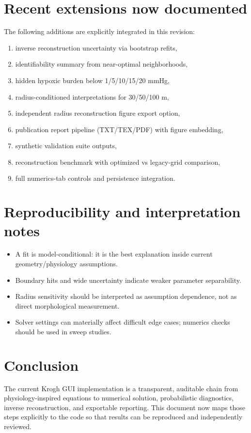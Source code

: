 \documentclass[12pt,a4paper]{article}
\begin{document}
\section{Recent extensions now documented}
The following additions are explicitly integrated in this revision:
\begin{enumerate}
    \item inverse reconstruction uncertainty via bootstrap refits,
    \item identifiability summary from near-optimal neighborhoods,
    \item hidden hypoxic burden below 1/5/10/15/20 mmHg,
    \item radius-conditioned interpretations for 30/50/100 \textmu m,
    \item independent radius reconstruction figure export option,
    \item publication report pipeline (TXT/TEX/PDF) with figure embedding,
    \item synthetic validation suite outputs,
    \item reconstruction benchmark with optimized vs legacy-grid comparison,
    \item full numerics-tab controls and persistence integration.
\end{enumerate}

\section{Reproducibility and interpretation notes}
\begin{itemize}
    \item A fit is model-conditional: it is the best explanation inside current geometry/physiology assumptions.
    \item Boundary hits and wide uncertainty indicate weaker parameter separability.
    \item Radius sensitivity should be interpreted as assumption dependence, not as direct morphological measurement.
    \item Solver settings can materially affect difficult edge cases; numerics checks should be used in sweep studies.
\end{itemize}

\section{Conclusion}
The current Krogh GUI implementation is a transparent, auditable chain from physiology-inspired equations to numerical solution, probabilistic diagnostics, inverse reconstruction, and exportable reporting. This document now maps those steps explicitly to the code so that results can be reproduced and independently reviewed.
\end{document}
